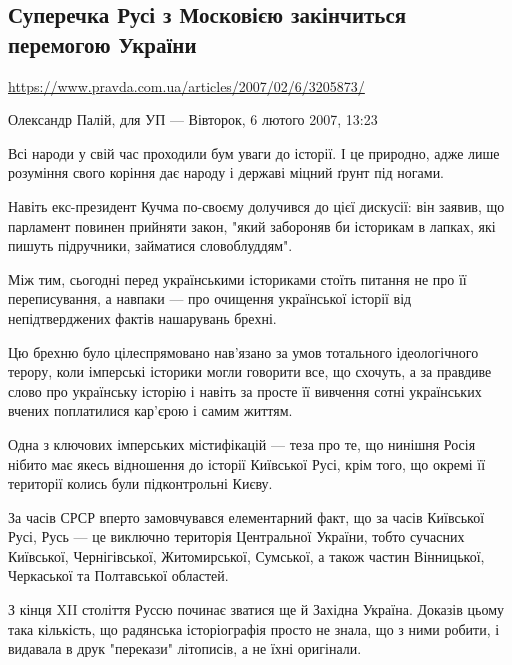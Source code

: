  
 

\subsection{Суперечка Русі з Московією закінчиться перемогою України}
\label{sec:2007}
\url{https://www.pravda.com.ua/articles/2007/02/6/3205873/}


Олександр Палій, для УП --- Вівторок, 6 лютого 2007, 13:23

Всі народи у свій час проходили бум уваги до історії. І це природно, адже лише
розуміння свого коріння дає народу і державі міцний ґрунт під ногами.

Навіть екс-президент Кучма по-своєму долучився до цієї дискусії: він заявив, що
парламент повинен прийняти закон, "який забороняв би історикам в лапках, які
пишуть підручники, займатися словоблуддям".

Між тим, сьогодні перед українськими істориками стоїть питання не про її
переписування, а навпаки --- про очищення української історії від непідтверджених
фактів нашарувань брехні.

Цю брехню було цілеспрямовано нав'язано за умов тотального ідеологічного
терору, коли імперські історики могли говорити все, що схочуть, а за правдиве
слово про українську історію і навіть за просте її вивчення сотні українських
вчених поплатилися кар'єрою і самим життям.

Одна з ключових імперських містифікацій --- теза про те, що нинішня Росія нібито
має якесь відношення до історії Київської Русі, крім того, що окремі її
території колись були підконтрольні Києву.

За часів СРСР вперто замовчувався елементарний факт, що за часів Київської
Русі, Русь --- це виключно територія Центральної України, тобто сучасних
Київської, Чернігівської, Житомирської, Сумської, а також частин Вінницької,
Черкаської та Полтавської областей.

З кінця XII століття Руссю починає зватися ще й Західна Україна. Доказів цьому
така кількість, що радянська історіографія просто не знала, що з ними робити, і
видавала в друк "перекази" літописів, а не їхні оригінали.

